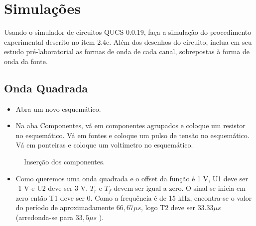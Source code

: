 \section{Simulações}

Usando o simulador de circuitos QUCS 0.0.19, faça a simulação do procedimento experimental descrito no item 2.4e. Além dos desenhos do circuito, inclua em seu estudo pré-laboratorial as formas de onda de cada canal, sobrepostas à forma de onda da fonte.


\subsection{Onda Quadrada}

\begin{itemize}
    \item Abra um novo esquemático.
\end{itemize}


\begin{itemize}
    \item Na aba Componentes, vá em componentes
    agrupados e coloque um resistor no esquemático.
    Vá em fontes e coloque um pulso de tensão no
    esquemático. Vá em ponteiras e coloque um
    voltímetro no esquemático.
\end{itemize}

\begin{figure}[H]
    \centering
    \caption{Inserção dos componentes.}
    \label{comp_ins}
\end{figure}

\newpage

\begin{itemize}
    \item Como queremos uma onda quadrada e o offset da função é 1 V, U1 deve ser -1 V e U2 deve ser 3 V. $T_r$ e $T_f$ devem ser igual a zero. O sinal se inicia em zero então T1 deve ser 0. Como a frequência é de 15 kHz, encontra-se o valor do período de aproximadamente $66,67 \mu s$, logo T2 deve ser $33.33 \mu s$ (arredonda-se para $33,5 \mu s$ ).
\end{itemize}


